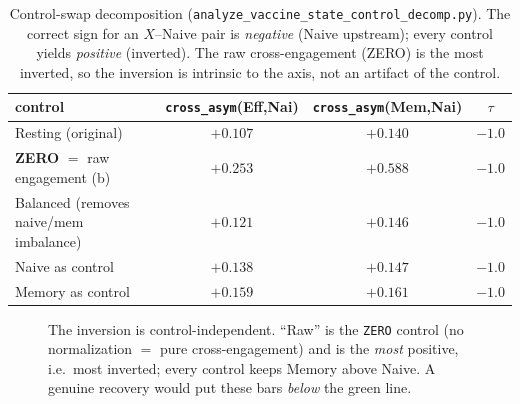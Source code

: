 \documentclass[11pt]{article}
\begin{document}
\begin{table}[h]
\centering
\small
\begin{tabular}{lccc}
\toprule
control & \texttt{cross\_asym}(Eff,Nai) & \texttt{cross\_asym}(Mem,Nai) & $\tau$ \\
\midrule
Resting (original)                 & $+0.107$ & $+0.140$ & $-1.0$ \\
\textbf{ZERO} $=$ raw engagement (b) & $\mathbf{+0.253}$ & $\mathbf{+0.588}$ & $-1.0$ \\
Balanced (removes naive/mem imbalance) & $+0.121$ & $+0.146$ & $-1.0$ \\
Naive as control                   & $+0.138$ & $+0.147$ & $-1.0$ \\
Memory as control                  & $+0.159$ & $+0.161$ & $-1.0$ \\
\bottomrule
\end{tabular}
\caption{Control-swap decomposition (\texttt{analyze\_vaccine\_state\_control\_decomp.py}).
The correct sign for an $X$--Naive pair is \emph{negative} (Naive upstream); every control
yields \emph{positive} (inverted). The raw cross-engagement (ZERO) is the most inverted, so the
inversion is intrinsic to the axis, not an artifact of the control.}
\label{tab:decomp}
\end{table}

\begin{figure}[h]
\centering
{}
\caption{The inversion is control-independent. ``Raw'' is the \texttt{ZERO} control (no
normalization $=$ pure cross-engagement) and is the \emph{most} positive, i.e.\ most inverted;
every control keeps Memory above Naive. A genuine recovery would put these bars \emph{below}
the green line.}
\label{fig:decomp}
\end{figure}
\end{document}
